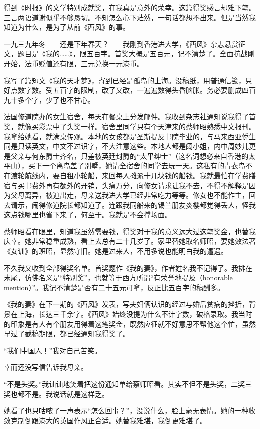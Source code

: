 \par 得到《时报》的文学特别成就奖，在我真是意外的荣幸。这篇得奖感言却难下笔。三言两语道谢似乎不够恳切。不知怎么心下茫然，一句话都想不出来。但是当然我知道为什么，是为了从前《西风》的事。
\par 一九三九年冬——还是下年春天？——我刚到香港进大学，《西风》杂志悬赏征文，题目是《我的……》，限五百字。首奖大概是五百元，记不清楚了。全面抗战刚开始，法币贬值还有限，三元兑换一元港币。
\par 我写了篇短文《我的天才梦》，寄到已经是孤岛的上海。没稿纸，用普通信笺，只好点数字数。受五百字的限制，改了又改，一遍遍数得头昏脑胀。务必要删成四百九十多个字，少了也不甘心。
\par 法国修道院办的女生宿舍，每天在餐桌上分发邮件。我收到杂志社通知说我得了首奖，就像买彩票中了头奖一样。宿舍里同学只有个天津来的蔡师昭熟悉中文报刊。我拿给她看，就满桌传观。本地的女孩都是圣斯提反书院毕业的，与马来西亚侨生同是只读英文，中文不过识字，不大注意这些。本地人都是阔小姐，内中周妙儿更是父亲与何东爵士齐名，只差被英廷封爵的“太平绅士”（这名词想必来自香港的太平山），买下一个离岛盖了别墅，她请全宿舍的同学去玩一天。这私有的青衣岛不在渡轮航线内，要自租小轮船，来回每人摊派十几块钱的船钱。我就最怕在学费膳宿与买书费外再有额外的开销，头痛万分，向修女请求让我不去，不得不解释是因为父母离异，被迫出走，母亲送我进大学已经非常吃力等等。修女也不能作主，回去请示，闹得修道院长都知道了。连跟我同船来的锡兰朋友炎樱都觉得丢人，怪我这点钱哪里也省下来了，何至于。我就是不会撑场面。
\par 蔡师昭看在眼里，知道我虽然需要钱，得奖对于我的意义远大过这笔奖金，也替我庆幸。她非常稳重成熟，看上去总有二十几岁了。家里替她取名师昭，要她效法著《女训》的班昭，显然守旧。她是过来人，不用多说也能明白我的遭遇。
\par 不久我又收到全部得奖名单。首奖题作《我的妻》，作者姓名我不记得了。我排在末尾，仿佛名义是“特别奖”，也就等于西方所谓“有荣誉地提及（honorable mention）”。我记不清楚是否有二十五元可拿，反正比五百字的稿酬多。
\par 《我的妻》在下一期的《西风》发表，写夫妇俩认识的经过与婚后贫病的挫折，背景在上海，长达三千余字。《西风》始终没提为什么不计字数，破格录取。我当时的印象是有人有个朋友用得着这笔奖金，既然应征就不好意思不帮他这个忙，虽然早过了截稿期限，都已经通知我得奖了。
\par “我们中国人！”我对自己苦笑。
\par 幸而还没写信告诉我母亲。
\par “不是头奖。”我讪讪地笑着把这份通知单给蔡师昭看。其实不但不是头奖，二奖三奖也都不是。我说话就是这样乏。
\par 她看了也只咕哝了一声表示“怎么回事？”，没说什么，脸上毫无表情。她的一种收敛克制倒跟港大的英国作风正合适。她替我难堪，我倒更难堪了。
